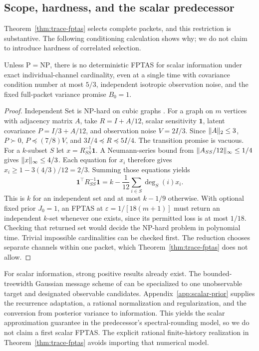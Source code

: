 \subsection{Scope, hardness, and the scalar predecessor}
\label{subsec:approximation-scope}
Theorem~\ref{thm:trace-fptas} selects complete packets, and this restriction
is substantive. The following conditioning calculation shows why; we do not
claim to introduce hardness of correlated selection.
\begin{proposition}
\label{prop:channel-hardness}
Unless $\mathrm P=\mathrm{NP}$, there is no deterministic FPTAS for scalar
information under exact individual-channel cardinality, even at a single time
with covariance condition number at most $5/3$, independent isotropic
observation noise, and the fixed full-packet variance promise $B_0=1$.
\end{proposition}
\begin{proof}
Independent Set is NP-hard on cubic graphs
\citep[Theorem 4.1(a)]{Mohar2001}. For a graph on $m$ vertices with adjacency
matrix $A$, take $R=I+A/12$, scalar sensitivity $\mathbf1$, latent covariance
$P=I/3+A/12$, and observation noise $V=2I/3$. Since
$\lVert A\rVert_2\le3$, $P\succ0$, $P\preceq(7/8)V$, and
$3I/4\preceq R\preceq5I/4$. The transition promise is vacuous.
For a $k$-subset $S$ let $x=R_{SS}^{-1}\mathbf1$. A Neumann-series bound
from $\lVert A_{SS}/12\rVert_\infty\le1/4$ gives
$\lVert x\rVert_\infty\le4/3$. Each equation for $x_i$ therefore gives
$x_i\ge1-3(4/3)/12=2/3$. Summing those equations yields
\[
 \mathbf1^\top R_{SS}^{-1}\mathbf1
 =k-\frac1{12}\sum_{i\in S}\deg_S(i)x_i.
\]
This is $k$ for an independent set and at most $k-1/9$ otherwise. With
optional fixed prior $J_0=1$, an FPTAS at
$\varepsilon=1/[18(m+1)]$ must return an independent $k$-set whenever one
exists, since its permitted loss is at most $1/18$. Checking that returned
set would decide the NP-hard problem in polynomial time. Trivial impossible
cardinalities can be checked first. The reduction chooses separate channels
within one packet, which Theorem~\ref{thm:trace-fptas} does not allow.
\end{proof}

For scalar information, strong positive results already exist. The
bounded-treewidth Gaussian message scheme of
\citet[Section 3.2, Theorem 43]{Mahalanabis2012} can be specialized to one
unobservable target and designated observable candidates.
Appendix~\ref{app:scalar-prior} supplies the recurrence adaptation, a rational
normalization and regularization, and the conversion from posterior variance
to information. This yields the scalar approximation guarantee in the
predecessor's spectral-rounding model, so we do not claim a first scalar
FPTAS. The explicit rational finite-history realization in
Theorem~\ref{thm:trace-fptas} avoids importing that numerical model.

